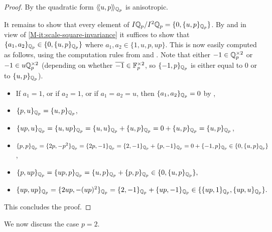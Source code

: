 \documentclass[12pt, leqno, british]{amsart}
\begin{document}
\begin{proof}
By  the quadratic form $\langle\!\langle u, p \rangle\!\rangle_{\mathbb Q_p}$ is anisotropic.

It remains to show that every element of $I\mathbb Q_p/I^2\mathbb Q_p = \lbrace 0, \lbrace u, p \rbrace_{\mathbb Q_p} \rbrace$.
By  and in view of \eqref{M-it:scale-square-invariance} it suffices to show that $\lbrace a_1, a_2 \rbrace_{\mathbb Q_p} \in \lbrace 0, \lbrace u, p \rbrace_{\mathbb Q_p} \rbrace$ where $a_1, a_2 \in \lbrace 1, u, p, up \rbrace$.
This is now easily computed as follows, using the computation rules from  and .
Note that either $-1 \in \mathbb Q_p^{\times 2}$ or $-1 \in u\mathbb Q_p^{\times 2}$ (depending on whether $\overline{-1} \in \mathbb F_p^{\times 2}$, so $\lbrace -1, p \rbrace_{\mathbb Q_p}$ is either equal to $0$ or to $\lbrace u, p \rbrace_{\mathbb Q_p}$).
\begin{itemize}
\item If $a_1 = 1$, or if $a_2 = 1$, or if $a_1 = a_2 = u$, then $\lbrace a_1, a_2 \rbrace_{\mathbb Q_p} = 0$ by ,
\item $\lbrace p, u \rbrace_{\mathbb Q_p} = \lbrace u, p \rbrace_{\mathbb Q_p}$,
\item $\lbrace up, u \rbrace_{\mathbb Q_p} = \lbrace u, up \rbrace_{\mathbb Q_p} = \lbrace u, u \rbrace_{\mathbb Q_p} + \lbrace u, p \rbrace_{\mathbb Q_p} = 0 + \lbrace u, p \rbrace_{\mathbb Q_p} = \lbrace u, p \rbrace_{\mathbb Q_p}$,
\item $\lbrace p, p \rbrace_{\mathbb Q_p} = \lbrace 2p, -p^2 \rbrace_{\mathbb Q_p} = \lbrace 2p, -1 \rbrace_{\mathbb Q_p} = \lbrace 2, -1 \rbrace_{\mathbb Q_p} + \lbrace p, -1 \rbrace_{\mathbb Q_p} = 0 + \lbrace -1, p \rbrace_{\mathbb Q_p} \in \lbrace 0, \lbrace u, p \rbrace_{\mathbb Q_p} \rbrace$,
\item $\lbrace p, up \rbrace_{\mathbb Q_p} = \lbrace up, p \rbrace_{\mathbb Q_p} = \lbrace u, p \rbrace_{\mathbb Q_p} + \lbrace p, p \rbrace_{\mathbb Q_p} \in \lbrace 0, \lbrace u, p \rbrace_{\mathbb Q_p} \rbrace,$
\item $\lbrace up, up \rbrace_{\mathbb Q_p} = \lbrace 2up, -(up)^2 \rbrace_{\mathbb Q_p} = \lbrace 2, -1 \rbrace_{\mathbb Q_p} + \lbrace up, -1 \rbrace_{\mathbb Q_p} \in \lbrace \lbrace up, 1 \rbrace_{\mathbb Q_p}, \lbrace up, u \rbrace_{\mathbb Q_p} \rbrace.$
\end{itemize}
This concludes the proof.
\end{proof}
We now discuss the case $p=2$.
\end{document}
